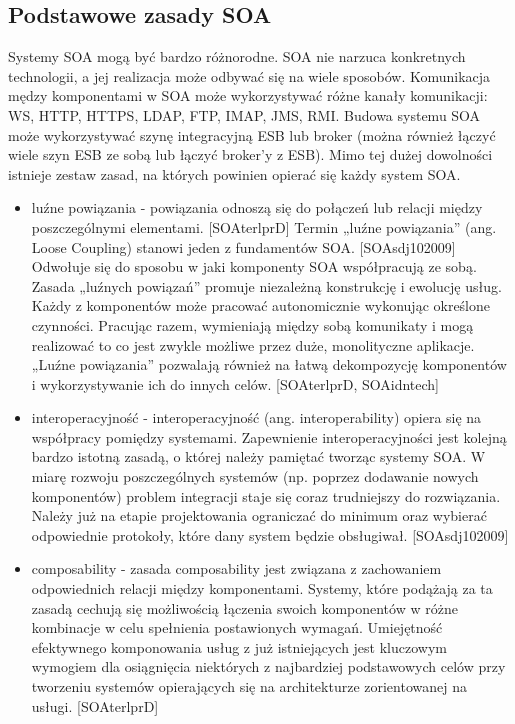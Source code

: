 \subsection{Podstawowe zasady SOA}
Systemy SOA mogą być bardzo różnorodne. SOA nie narzuca konkretnych technologii, a jej realizacja może odbywać się na wiele sposobów. Komunikacja mędzy komponentami w SOA może wykorzystywać różne kanały komunikacji: WS, HTTP, HTTPS, LDAP, FTP, IMAP, JMS, RMI. Budowa systemu SOA może wykorzystywać szynę integracyjną ESB lub broker (można również łączyć wiele szyn ESB ze sobą lub łączyć broker’y z ESB). Mimo tej dużej dowolności istnieje zestaw zasad, na których powinien opierać się każdy system SOA.
\begin{itemize}
\item{luźne powiązania - powiązania odnoszą się do połączeń lub relacji między poszczególnymi elementami. [SOAterlprD] Termin „luźne powiązania” (ang. Loose Coupling) stanowi jeden z fundamentów SOA. [SOAsdj102009] Odwołuje się do sposobu w jaki komponenty SOA współpracują ze sobą.  Zasada „luźnych powiązań” promuje niezależną konstrukcję i ewolucję usług. Każdy z komponentów może pracować autonomicznie wykonując określone czynności. Pracując razem, wymieniają między sobą komunikaty i mogą realizować to co jest zwykle możliwe przez duże, monolityczne aplikacje. „Luźne powiązania” pozwalają również na łatwą dekompozycję komponentów i wykorzystywanie ich do innych celów. [SOAterlprD, SOAidntech]}
\item{interoperacyjność - interoperacyjność (ang. interoperability) opiera się na współpracy pomiędzy systemami. Zapewnienie interoperacyjności jest kolejną bardzo istotną zasadą, o której należy pamiętać tworząc systemy SOA. W miarę rozwoju poszczególnych systemów (np. poprzez dodawanie nowych komponentów) problem integracji staje się coraz trudniejszy do rozwiązania. Należy już na etapie projektowania ograniczać do minimum oraz wybierać odpowiednie protokoły, które dany system będzie obsługiwał. [SOAsdj102009]}
\item{composability - zasada composability jest związana z zachowaniem odpowiednich relacji między komponentami. Systemy, które podążają za ta zasadą cechują się możliwością łączenia swoich komponentów w różne kombinacje w celu spełnienia postawionych wymagań. Umiejętność efektywnego komponowania usług z już istniejących jest kluczowym wymogiem dla osiągnięcia niektórych z najbardziej podstawowych celów przy tworzeniu systemów opierających się na architekturze zorientowanej na usługi. [SOAterlprD]}

\end{itemize}
